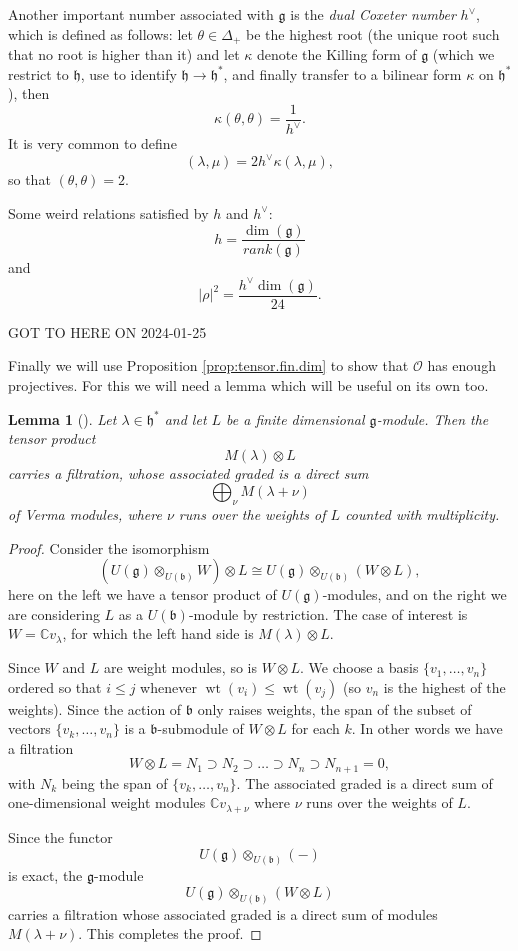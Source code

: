 \documentclass[12pt]{article}
\theoremstyle{plain}
\newtheorem{lemma}[thm]{Lemma}
\theoremstyle{definition}
\numberwithin{equation}{section}
\DeclareMathOperator{\wt}{wt}
\newcommand{\la}{\lambda}
\newcommand{\D}{\Delta}
\newcommand{\C}{\mathbb{C}}
\newcommand{\g}{\mathfrak{g}}
\newcommand{\h}{\mathfrak{h}}
\newcommand{\fb}{\mathfrak{b}}
\newcommand{\OO}{\mathcal{O}}
\begin{document}
Another important number associated with $\g$ is the \emph{dual Coxeter number} $h^\vee$, which is defined as follows: let $\theta \in \D_+$ be the highest root (the unique root such that no root is higher than it) and let $\kappa$ denote the Killing form of $\g$ (which we restrict to $\h$, use to identify $\h \rightarrow \h^*$, and finally transfer to a bilinear form $\kappa$ on $\h^*$), then
\[
\kappa(\theta, \theta) = \frac{1}{h^\vee}.
\]
It is very common to define
\[
(\lambda, \mu) = 2 h^\vee \kappa(\la, \mu),
\]
so that $(\theta, \theta) = 2$.

Some weird relations satisfied by $h$ and $h^\vee$:
\[
h = \frac{\dim(\g)}{rank(\g)}
\]
and
\[
|\rho|^2 = \frac{h^\vee \dim(\g)}{24}.
\]





{\color{red}GOT TO HERE ON 2024-01-25}


Finally we will use Proposition \ref{prop:tensor.fin.dim} to show that $\OO$ has enough projectives. For this we will need a lemma which will be useful on its own too.
\begin{lemma}[{\cite[Theorem 3.6]{humbgg}}]\label{lem:Verma.filtration}
Let $\lambda \in \h^*$ and let $L$ be a finite dimensional $\g$-module. Then the tensor product
\[
M(\lambda) \otimes L
\]
carries a filtration, whose associated graded is a direct sum
\[
\bigoplus_{\nu} M(\lambda+\nu)
\]
of Verma modules, where $\nu$ runs over the weights of $L$ counted with multiplicity.
\end{lemma}

\begin{proof}
Consider the isomorphism
\[
(U(\g) \otimes_{U(\fb)} W) \otimes L \cong U(\g) \otimes_{U(\fb)} (W \otimes L),
\]
here on the left we have a tensor product of $U(\g)$-modules, and on the right we are considering $L$ as a $U(\fb)$-module by restriction. The case of interest is $W = \C v_\la$, for which the left hand side is $M(\la) \otimes L$.

Since $W$ and $L$ are weight modules, so is $W \otimes L$. We choose a basis $\{v_1, \ldots, v_n\}$ ordered so that $i \leq j$ whenever $\wt(v_i) \leq \wt(v_j)$ (so $v_n$ is the highest of the weights). Since the action of $\fb$ only raises weights, the span of the subset of vectors $\{v_k, \ldots, v_n\}$ is a $\fb$-submodule of $W \otimes L$ for each $k$. In other words we have a filtration
\[
W \otimes L = N_1 \supset N_2 \supset \ldots \supset N_n \supset N_{n+1} = 0,
\]
with $N_k$ being the span of $\{v_k, \ldots, v_n\}$. The associated graded is a direct sum of one-dimensional weight modules $\C v_{\la+\nu}$ where $\nu$ runs over the weights of $L$.

Since the functor
\[
U(\g) \otimes_{U(\fb)} (-)
\]
is exact, the $\g$-module
\[
U(\g) \otimes_{U(\fb)} (W \otimes L)
\]
carries a filtration whose associated graded is a direct sum of modules $M(\la+\nu)$. This completes the proof.
\end{proof}
\end{document}
